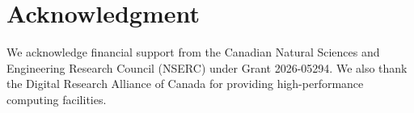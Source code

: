 \documentclass[12pt]{article}
\begin{document}
%
%
%





\section*{Acknowledgment}
We acknowledge financial support from the Canadian Natural Sciences and Engineering Research Council (NSERC) under Grant 2026-05294. We also thank the Digital Research Alliance of Canada for providing high-performance computing facilities.




\newpage

\vspace{-0.5cm}
\end{document}
